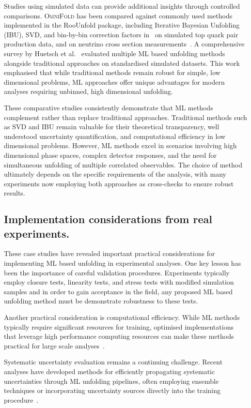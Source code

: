     Studies using simulated data can provide additional insights through controlled comparisons.
    \textsc{OmniFold} has been compared against commonly used methods implemented in the RooUnfold package, including Iterative Bayesian Unfolding (IBU), SVD, and bin-by-bin correction factors in~\cite{Baron:2021vvl} on simulated top quark pair production data, and on neutrino cross section measurements~\cite{Huang2025MachineTechnique}.
    A comprehensive survey by Huetsch et al.~\cite{Huetsch:2024quz} evaluated multiple ML based unfolding methods alongside traditional approaches on standardised simulated datasets.
    This work emphasised that while traditional methods remain robust for simple, low dimensional problems, ML approaches offer unique advantages for modern analyses requiring unbinned, high dimensional unfolding.

    These comparative studies consistently demonstrate that ML methods complement rather than replace traditional approaches.
    Traditional methods such as SVD and IBU remain valuable for their theoretical transparency, well understood uncertainty quantification, and computational efficiency in low dimensional problems.
    However, ML methods excel in scenarios involving high dimensional phase spaces, complex detector responses, and the need for simultaneous unfolding of multiple correlated observables.
    The choice of method ultimately depends on the specific requirements of the analysis, with many experiments now employing both approaches as cross-checks to ensure robust results.
    
\subsection{Implementation considerations from real experiments.}
    These case studies have revealed important practical considerations for implementing ML based unfolding in experimental analyses.
    One key lesson has been the importance of careful validation procedures.
    Experiments typically employ closure tests, linearity tests, and stress tests with modified simulation samples and in order to gain acceptance in the field, any proposed ML based unfolding method must be demonstrate robustness to these tests.

    Another practical consideration is computational efficiency.
    While ML methods typically require significant resources for training, optimised implementations that leverage high performance computing resources can make these methods practical for large scale analyses~\cite{HEPSoftwareFoundation:2017ggl}.
    
    Systematic uncertainty evaluation remains a continuing challenge.
    Recent analyses have developed methods for efficiently propagating systematic uncertainties through ML unfolding pipelines, often employing ensemble techniques or incorporating uncertainty sources directly into the training procedure~\cite{Falcao:2025jom,Huang2025MachineTechnique}.

